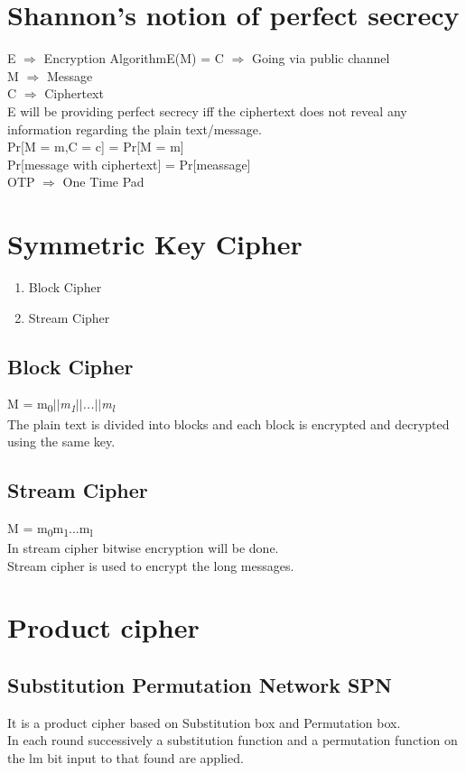 \documentclass[11pt]{article}
\begin{document}
	\section{Shannon's notion of perfect secrecy}
	E $\Rightarrow$ Encryption Algorithm\hfill E(M) = C $\Rightarrow$ Going via public channel\\
	M $\Rightarrow$ Message\\
	C $\Rightarrow$ Ciphertext\\
	\vspace{0.1cm}
	E will be providing perfect secrecy iff the ciphertext does not reveal any information regarding the plain text/message.\vspace{0.1cm}\\
	Pr[M = m,C = c] = Pr[M = m]\\
	Pr[message with ciphertext] = Pr[meassage]\\
	OTP $\Rightarrow$ One Time Pad
	\section{Symmetric Key Cipher}
	\begin{enumerate}
		\item Block Cipher
		\item Stream Cipher
	\end{enumerate}
	\subsection{Block Cipher}
	M = m\textsubscript{0}\textit{$||$m\textsubscript{1}$||$...$||$m\textsubscript{l}}\\
	The plain text is divided into blocks and each block is encrypted and decrypted using the same key.
	\subsection{Stream Cipher}
	M = m\textsubscript{0}m\textsubscript{1}...m\textsubscript{l}\\
	In stream cipher bitwise encryption will be done.\\
	Stream cipher is used to encrypt the long messages.
	\section{Product cipher}
	
	
	\subsection{Substitution Permutation Network SPN}
	It is a product cipher based on Substitution box and Permutation box.\\ 
	In each round successively a substitution function and a permutation function on the lm bit input to that found are applied.
	
\end{document}
